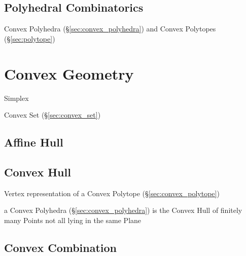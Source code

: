 \subsection{Polyhedral Combinatorics}\label{sec:polyhedral_combinatorics}

Convex Polyhedra (\S\ref{sec:convex_polyhedra}) and Convex Polytopes
(\S\ref{sec:polytope})



\section{Convex Geometry}\label{sec:convex_geometry}

Simplex

Convex Set (\S\ref{sec:convex_set})



\subsection{Affine Hull}\label{sec:affine_hull}

\subsection{Convex Hull}\label{sec:convex_hull}

Vertex representation of a Convex Polytope (\S\ref{sec:convex_polytope})

a Convex Polyhedra (\S\ref{sec:convex_polyhedra}) is the Convex Hull of
finitely many Points not all lying in the same Plane



\subsection{Convex Combination}\label{sec:convex_combination}

